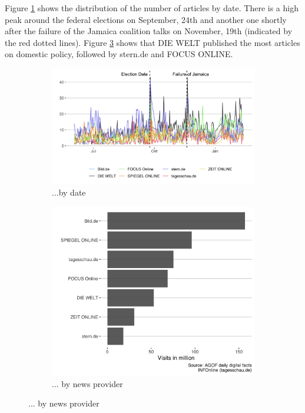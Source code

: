 \documentclass[12pt,a4paper,notitlepage]{article}
\begin{document}
 Figure \ref{fig_distr1} shows the distribution of the number of articles by date. There is a high peak around the federal elections on September, 24th and another one shortly after the failure of the Jamaica coalition talks on November, 19th (indicated by the red dotted lines). Figure \ref{fig_distr2} shows that DIE WELT published the most articles on domestic policy, followed by stern.de and FOCUS ONLINE.  

\begin{figure}[H]
	\caption{Article distribution...}
	\begin{center}
		\begin{subfigure}[normla]{0.59\textwidth}
			\includegraphics[width=\textwidth]{../figs/article_timeline.png}
			\caption{...by date}
			\label{fig_distr1}
		\end{subfigure}
		\begin{subfigure}[normla]{0.4\textwidth}
			\includegraphics[width=\textwidth]{../figs/visits.png}
			\caption{... by news provider}
			\label{fig_distr2}
		\end{subfigure}
	\end{center}
\end{figure}
\end{document}
